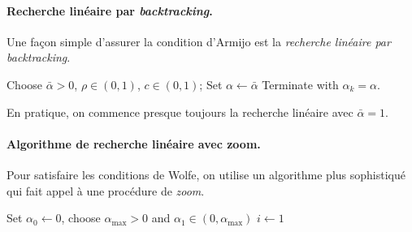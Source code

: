 \paragraph{Recherche linéaire par \emph{backtracking}.}

Une façon simple d’assurer la condition d’Armijo est la \emph{recherche linéaire
par backtracking}.

\begin{algorithm}[H]
\caption{Recherche linéaire avec retour en arrière (Backtracking)}
\label{alg:backtracking}
Choose $\bar{\alpha} > 0$, $\rho \in (0,1)$, $c \in (0,1)$; Set $\alpha \leftarrow \bar{\alpha}$\;
Terminate with $\alpha_k = \alpha$.
\end{algorithm}

\begin{remarque}
En pratique, on commence presque toujours la recherche linéaire avec $\bar{\alpha} = 1$.
\end{remarque}

\paragraph{Algorithme de recherche linéaire avec zoom.}

Pour satisfaire les conditions de Wolfe, on utilise un algorithme plus sophistiqué qui fait appel à une procédure de \emph{zoom}.

\begin{algorithm}[H]
\caption{Algorithme de recherche linéaire}
\label{alg:line-search}
Set $\alpha_0 \leftarrow 0$, choose $\alpha_{\max} > 0$ and $\alpha_1 \in (0, \alpha_{\max})$\;
$i \leftarrow 1$\;
\end{algorithm}

\begin{algorithm}[H]
\caption{Procédure zoom}
\label{alg:zoom}
\end{algorithm}

